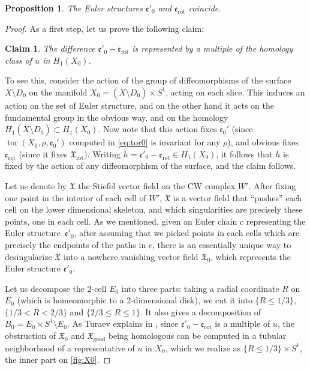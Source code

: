 \documentclass[10pt]{amsart}
\theoremstyle{plain}
\newtheorem{prop}[thm]{Proposition}
\newtheorem*{claim}{Claim}
\theoremstyle{definition}
\theoremstyle{remark}
\newcommand{\rot}{\mathrm{rot}}
\newcommand{\geod}{\mathrm{geod}}
\numberwithin{equation}{section}
\DeclareMathOperator{\tor}{tor}
\begin{document}
\begin{prop}\label{prop:euler}
The Euler structures $\mathfrak e'_0$ and $\mathfrak e_\rot$ coincide.
\end{prop}

\begin{proof}
As a first step, let us prove the following claim:
\begin{claim}
The difference $\mathfrak e'_0 - \mathfrak e_\rot$ is represented by a multiple of the homology class of $u$ in $H_1(X_0)$.
\end{claim}
To see this, consider the action of the group of diffeomorphisms of the surface $\overline X \setminus D_0$ on the manifold $X_0 = (\overline X \setminus D_0) \times S^1$, acting on each slice.
This induces an action on the set of Euler structure, and on the other hand it acts on the fundamental group in the obvious way, and on the homology $H_1(\overline X \setminus D_0) \subset H_1(X_0)$. Now note that this action fixes $\mathfrak e_0'$ (since $\tor(X_0, \rho, \mathfrak e_0')$ computed in \cref{eq:tor0} is invariant for any $\rho$), and obvious fixes $\mathfrak e_\rot$ (since it fixes $\mathfrak X_\rot$). Writing $h = \mathfrak e'_0 - \mathfrak e_\rot \in H_1(X_0)$, it follows that $h$ is fixed by the action of any diffeomorphism of the surface, and the claim follows.


Let us denote by $\mathfrak X$ the Stiefel vector field on the CW complex $W'$. After fixing one point in the interior of each cell of $W'$, $\mathfrak X$ is a vector field that ``pushes'' each cell on the lower dimensional skeleton, and which singularities are precisely these points, one in each cell. As we mentioned, given an Euler chain $c$ representing the Euler structure~$\mathfrak e'_0$, after assuming that we picked points in each cells which are precisely the endpoints of the paths in $c$, there is an essentially unique way to desingularize $\mathfrak X$ into a nowhere vanishing vector field $\mathfrak X_0$, which represents the Euler structure $\mathfrak e'_0$.

Let us decompose the 2-cell $E_0$ into three parts: taking a radial coordinate $R$ on $E_0$ (which is homeomorphic to a 2-dimensional disk), we cut it into $\{ R\!\le\! 1/3\}$, \hbox{$\{1/3 \!<\! R \!<\! 2/3\}$} and $\{2/3\!\le\! R \!\le\! 1\}$. It also gives a decomposition of \hbox{$B_0 \!=\! E_0 \!\times\! S^1 \!\setminus\! E_0$}.
As Turaev explains in \cite[\S 5.2]{Turaev}, since $\mathfrak e'_0 - \mathfrak e_\rot$ is a multiple of $u$, the obstruction of $\mathfrak X_0$ and $\mathfrak X_\geod$ being homologous can be computed in a tubular neighborhood of a representative of $u$ in $X_0$, which we realize as
$\{ R\le 1/3\} \times S^1$, the inner part on \cref{fig:X0}.


\end{proof}
\end{document}
